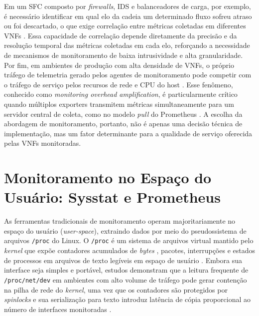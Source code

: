 Em um SFC composto por \textit{firewalls}, IDS e balanceadores de carga, por exemplo, é necessário identificar em qual elo da cadeia um determinado fluxo sofreu atraso ou foi descartado, o que exige correlação entre métricas coletadas em diferentes VNFs \cite{10.23919, oliveira_observability_2026}. Essa capacidade de correlação depende diretamente da precisão e da resolução temporal das métricas coletadas em cada elo, reforçando a necessidade de mecanismos de monitoramento de baixa intrusividade e alta granularidade.
Por fim, em ambientes de produção com alta densidade de VNFs, o próprio tráfego de telemetria gerado pelos agentes de monitoramento pode competir com o tráfego de serviço pelos recursos de rede e CPU do host \cite{kannan2024designing}. Esse fenômeno, conhecido como \textit{monitoring overhead amplification}, é particularmente crítico quando múltiplos exporters transmitem métricas simultaneamente para um servidor central de coleta, como no modelo \textit{pull} do Prometheus \cite{usman_observability_2022}. A escolha da abordagem de monitoramento, portanto, não é apenas uma decisão técnica de implementação, mas um fator determinante para a qualidade de serviço oferecida pelas VNFs monitoradas.

\section{Monitoramento no Espaço do Usuário: Sysstat e Prometheus}
\label{sec:sysstat_prometheus}

As ferramentas tradicionais de monitoramento operam majoritariamente no espaço do usuário (\textit{user-space}), extraindo dados por meio do pseudossistema de arquivos \texttt{/proc} do Linux. O \texttt{/proc} é um sistema de arquivos virtual mantido pelo \textit{kernel} que expõe contadores acumulados de \textit{bytes} , pacotes, interrupções e estados de processos em arquivos de texto legíveis em espaço de usuário \cite{linux_proc_man}. Embora sua interface seja simples e portável, estudos demonstram que a leitura frequente de \texttt{/proc/net/dev} em ambientes com alto volume de tráfego pode gerar contenção na pilha de rede do \textit{kernel}, uma vez que os contadores são protegidos por \textit{spinlocks} e sua serialização para texto introduz latência de cópia proporcional ao número de interfaces monitoradas \cite{10.1145/3452296.3472888}.

